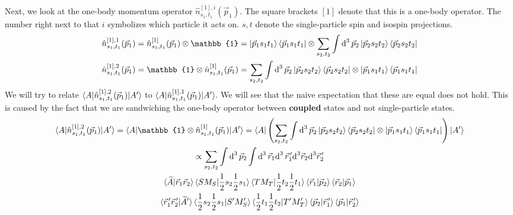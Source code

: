 \documentclass[10pt]{article}
\begin{document}
Next, we look at the 
one-body momentum operator $\hat{n}^{[1],i}_{s_1,t_1}(\vec{p}_1)$. The square 
brackets $[1]$ denote that this is a one-body operator. The number right next 
to that $i$ symbolizes which particle it acts on. $s,t$ denote the 
single-particle spin and isospin projections.
\begin{align*}
	\hat{n}^{[1],1}_{s_1,t_1}(\vec{p}_1) &= 
\hat{n}^{[1]}_{s_1,t_1}(\vec{p}_1) \otimes \mathbb{1} = \ket{\vec{p}_1 s_1 t_1} 
\bra{ \vec{p}_1 s_1 t_1} \otimes \sum_{s_2,t_2} \int \text{d}^{3} \, 
\vec{p}_{2} \ket{ \vec{p}_2 s_2 t_2} \bra{ \vec{p}_2 s_2 t_2} \\
	\hat{n}^{[1],2}_{s_1,t_1}(\vec{p}_1) &= \mathbb{1} \otimes 
\hat{n}^{[1]}_{s_1,t_1}(\vec{p}_1) = \sum_{s_2,t_2} \int \text{d}^{3} \, 
\vec{p}_{2} \ket{ \vec{p}_2 s_2 t_2} \bra{ \vec{p}_2 s_2 t_2} \otimes \ket{ 
\vec{p}_1 s_1 t_1} \bra{ \vec{p}_1 s_1 t_1} 
\end{align*}
We will try to relate $ \braket{ A | \hat{n}^{[1],2}_{s_1,t_1}(\vec{p}_1) | 
A'}$ to $ \braket{ A | \hat{n}^{[1],1}_{s_1,t_1}(\vec{p}_1) | A'}$. We will see 
that the naive expectation that these are equal does not hold. This is caused 
by the fact that we are sandwiching the one-body operator between 
\textbf{coupled} states and not single-particle states.
\begin{multline*}
	\braket{ A | \hat{n}^{[1],2}_{s_1,t_1}(\vec{p}_1)| A'} = \braket{ A | 
\mathbb{1} \otimes \hat{n}^{[1]}_{s_1,t_1}(\vec{p}_1) | A'} = \bra{ A } \left( 
\sum_{s_2,t_2} \int \text{d}^{3} \, \vec{p}_{2} \ket{ \vec{p}_2 s_2 t_2} \bra{ 
\vec{p}_2 s_2 t_2} \otimes \ket{ \vec{p}_1 s_1 t_1} \bra{ \vec{p}_1 s_1 t_1} 
\right) \ket{ A' } \\
	\propto \sum_{s_2,t_2} \int \text{d}^{3} \, \vec{p}_{2} \int 
\text{d}^{3} \, \vec{r}_{1} \text{d}^{3} \, \vec{r}_{1}^{\,\prime} \text{d}^{3} 
\vec{r}_{2} \text{d}^{3} \vec{r}_{2}^{\,\prime} \\
	\braket{ \widetilde{A} | \vec{r}_{1} \vec{r}_{2}} \braket { S M_S | 
\frac{1}{2} s_2 \frac{1}{2} s_1 } \braket{ T M_T | \frac{1}{2} t_2 \frac{1}{2} 
t_1 } \braket{ \vec{r}_{1} | \vec{p}_{2} } \braket{ \vec{r}_{2} | \vec{p}_{1}} 
\\
	\braket{ \vec{r}_{1}^{\,\prime} \vec{r}_{2}^{\,\prime} | 
\widetilde{A}'} \braket{ \frac{1}{2} s_2 \frac{1}{2} s_1 | S' M_S'} \braket{ 
\frac{1}{2} t_1 \frac{1}{2} t_2 | T' M_T'} \braket{ \vec{p}_2 | 
\vec{r}_{1}^{\,\prime}} \braket{ \vec{p}_{1} | \vec{r}_{2}^{\,\prime}} \\
\end{multline*}
\end{document}
